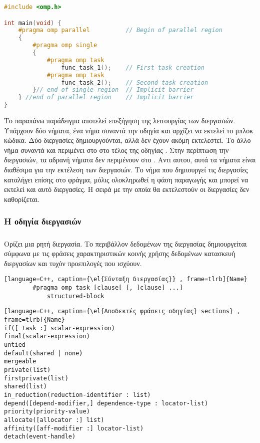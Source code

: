 		\begin{lstlisting}[tabsize=4, basicstyle=\small, language=C++, caption={\el{Παράδειγμα κώδικα με διεργασίες}}, frame=tb]
#include <omp.h>

int main(void) {	
	#pragma omp parallel          // Begin of parallel region
	{
		#pragma omp single
		{
			#pragma omp task
				func_task_1();    // First task creation
			#pragma omp task
				func_task_2();    // Second task creation
		}// end of single region  // Implicit barrier
	} //end of parallel region    // Implicit barrier
}
\end{lstlisting}
\clearpage
Το παραπάνω παράδειγμα αποτελεί επεξήγηση της λειτουργίας των διεργασιών. Υπάρχουν δύο νήματα, ένα νήμα συναντά την οδηγία \emph{} και αρχίζει να εκτελεί το μπλοκ κώδικα. Δύο διεργασίες δημιουργούνται, αλλά δεν έχουν ακόμη εκτελεστεί. Tο άλλο νήμα συναντά και περιμένει στο  \emph{} στο τέλος της οδηγίας \emph{}. Στην περίπτωση την διεργασιών, τα αδρανή νήματα δεν περιμένουν στο \emph{}. Αντι αυτου, αυτά τα νήματα είναι διαθέσιμα για την εκτέλεση των διεργασιών. Το νήμα που δημιουργεί τις διεργασίες καταλήγει επίσης στο φράγμα, μόλις ολοκληρωθεί η φάση παραγωγής και μπορεί να εκτελεί και αυτό διεργασίες. Η σειρά με την οποία θα εκτελεστούν οι διεργασίες δεν καθορίζεται.

\subsubsection{Η οδηγία διεργασιών}
\subparagraph{}
	Ορίζει μια ρητή διεργασία. Το περιβάλλον δεδομένων της διεργασίας δημιουργείται σύμφωνα με τις φράσεις χαρακτηριστικών κοινής χρήσης δεδομένων κατασκευή διεργασίων και τυχόν προεπιλογές που ισχύουν\cite{thenextstep20}.
	
\begin{lstlisting}[language=C++, caption={\el{Σύνταξη διεργασίας}} , frame=tlrb]{Name}
		#pragma omp task [clause[ [, ]clause] ...] 
			structured-block 
\end{lstlisting}

\begin{lstlisting}[language=C++, caption={\el{Αποδεκτές φράσεις οδηγίας} sections} , frame=tlrb]{Name}
if([ task :] scalar-expression) 
final(scalar-expression) 
untied 
default(shared | none) 
mergeable 
private(list) 
firstprivate(list) 
shared(list) 
in_reduction(reduction-identifier : list) 
depend([depend-modifier,] dependence-type : locator-list) 
priority(priority-value) 
allocate([allocator :] list) 
affinity([aff-modifier :] locator-list) 
detach(event-handle)
\end{lstlisting}

